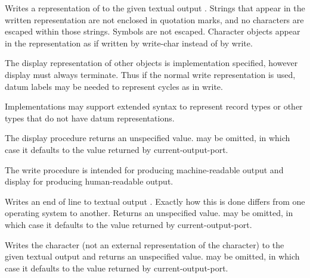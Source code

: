 \begin{entry}{%
}

Writes a representation of  to the given textual output .
Strings that appear in the written representation are not enclosed in
quotation marks, and no characters are escaped within those strings.  
Symbols are not escaped.  Character
objects appear in the representation as if written by {\cf write-char}
instead of by {\cf write}.

The {\cf display} representation of other objects is implementation
specified, however {\cf display} must always terminate.  Thus if the
normal {\cf write} representation is used, datum labels may be needed
to represent cycles as in {\cf write}.

Implementations may support extended syntax to represent record types or
other types that do not have datum representations.

The {\cf display} procedure returns an unspecified value.
 may be omitted, in which case it defaults to the
value returned by {\cf current-output-port}.

\begin{rationale}
The {\cf write} procedure is intended
for producing mach\-ine-readable output and {\cf display} for producing
human-readable output.  
\end{rationale}
\end{entry}


\begin{entry}{%
}

Writes an end of line to textual output .  Exactly how this
is done differs
from one operating system to another.  Returns an unspecified value.
 may be omitted, in which case it defaults to the
value returned by {\cf current-output-port}.

\end{entry}


\begin{entry}{%
}

Writes the character  (not an external representation of the
character) to the given textual output  and returns an unspecified
value.  
 may be omitted, in which case it defaults to the value
returned by {\cf current-output-port}.

\end{entry}

